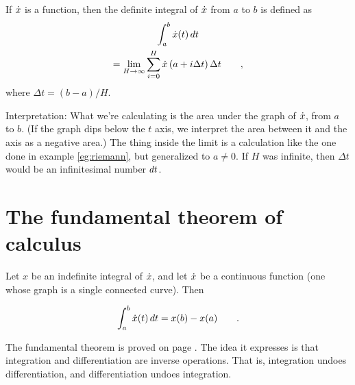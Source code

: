 \begin{important}
If $\dot{x}$ is a function, then the definite integral of $\dot{x}$ from $a$ to $b$ is
defined as
\begin{multline*}
  \int_{a}^{b} \dot{x}(t) \mathop{d\!} t \\
= \lim_{H\rightarrow\infty} \sum_{i=0}^{H} \dot{x}\left(a+i\Delta t\right)\Delta t \qquad ,
\end{multline*}
where $\Delta t=(b-a)/H$.

Interpretation: What we're calculating is
the area under the graph of $\dot{x}$, from $a$ to $b$. (If the graph dips below the $t$ axis, we interpret the
area between it and the axis as a negative area.)
The thing inside the limit is a calculation like the one done in example \ref{eg:riemann},
but generalized to $a\ne 0$.
If $H$ was infinite, then $\Delta t$ would be an infinitesimal number $\mathop{d\!} t$. 
\end{important}

\section{The fundamental theorem of calculus}

\begin{important}
Let $x$ be an indefinite integral of $\dot{x}$, and let $\dot{x}$ be a continuous
function (one whose graph is a single connected curve). Then

\begin{equation*}
  \int_{a}^{b} \dot{x}(t) \mathop{d\!} t = x(b)-x(a) \qquad .
\end{equation*}
\end{important}

The fundamental theorem is proved on page \pageref{detour:fundamental-thm-proof}.
The idea it expresses is that integration and differentiation are inverse operations.
That is, integration undoes differentiation, and differentiation undoes integration.

